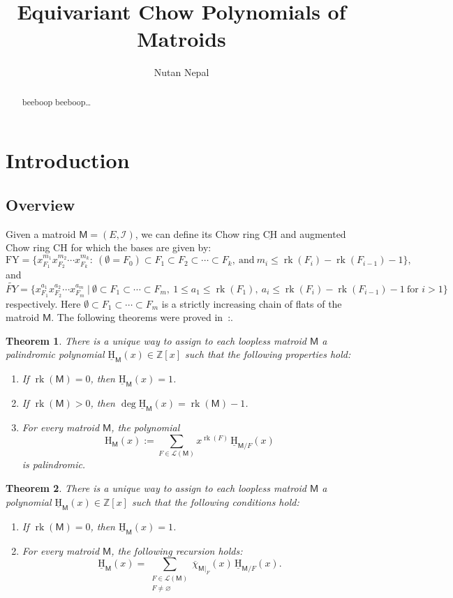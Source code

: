 \documentclass[10pt, a4paper, english]{amsart}
\title[Equivariant Chow Polynomials of Matroids]{Equivariant Chow Polynomials of Matroids}
\author[N. Nepal]{Nutan Nepal}
\theoremstyle{teoremas}
\newtheorem{theorem}{Theorem}[section]
\theoremstyle{definition}
\DeclareMathOperator{\rk}{rk}
\newcommand{\M}{\mathsf{M}}
\newcommand{\cI}{\mathcal{I}}
\newcommand{\Z}{\mathbb{Z}}
\newcommand{\rank}{\operatorname{rk}}
\renewcommand{\H}{\mathrm{H}}
\newcommand{\CH}{\mathrm{CH}}
\newcommand{\uH}{\underline{\mathrm{H}}}
\newcommand{\uCH}{\underline{\mathrm{CH}}}
\begin{document}
\begin{abstract}
    beeboop beeboop\dots
\end{abstract}

\maketitle

\section{Introduction}\label{sec:introduction}

\subsection{Overview}
Given a matroid $\M = (E, \cI)$, we can define its Chow ring $\uCH$ and augmented Chow ring $\CH$ for which the bases are given by:
    $$\text{FY}=\{x_{F_1}^{m_1}x_{F_2}^{m_2}\cdots x_{F_k}^{m_k}:\ (\emptyset = F_0)\subset
        F_1\subset F_2\subset\cdots\subset
        F_k,\ \text{and}\ m_i\leq\rank(F_i)-\rank(F_{i-1})-1 \},$$
and
    $$\widetilde{FY} = \{x_{F_1}^{a_1}x_{F_2}^{a_2}\cdots x_{F_m}^{a_m}\ 
    |\ \emptyset\subset F_1\subset\cdots\subset F_m,\ 1\leq a_1\leq \rank(F_1)
    ,\ a_i\leq\rank(F_i)-\rank(F_{i-1})-1\ \text{for } i>1\}$$
respectively. Here $\emptyset\subset F_1\subset\cdots\subset F_m$ is a strictly increasing chain of flats of the matroid $\M$.
The following theorems were proved in~\cite{fmsv24}:.

\begin{theorem}\label{thm:main-recursion-defi-H-and-uH}
    There is a unique way to assign to each loopless matroid $\M$ a palindromic polynomial $\uH_{\M}(x) \in \Z[x]$ such that the following properties hold:
    \begin{enumerate}[\normalfont(i)]
        \item If $\rk(\M) = 0$, then $\uH_{\M}(x) = 1$.\label{it:mainfirst}\
        \item If $\rk(\M) > 0$, then $\deg \uH_{\M}(x) = \rk(\M) - 1$.\label{it:mainsecond}
        \item For every matroid $\M$, the polynomial
            \[ \H_{\M}(x) := \sum_{F\in \mathcal{L}(\M)} x^{\rk(F)}\, \uH_{\M/F}(x)\]
        is palindromic.\label{it:mainthird}
    \end{enumerate}
\end{theorem}

\begin{theorem}\label{thm:intro-main0}
    There is a unique way to assign to each loopless matroid $\M$  a polynomial $\uH_{\M}(x)\in \mathbb{Z}[x]$ such that the following conditions hold:
    \begin{enumerate}[\normalfont(i)]
        \item If $\rk(\M) = 0$, then $\uH_{\M}(x) = 1$.
        \item For every matroid $\M$, the following recursion holds:
            \[ \uH_{\M}(x) = \sum_{\substack{F\in\mathcal{L}(\M)\\ F\neq\varnothing}} \overline{\chi}_{\M|_F}(x)\, \uH_{\M/F}(x).\]
    \end{enumerate}
\end{theorem}
\end{document}
